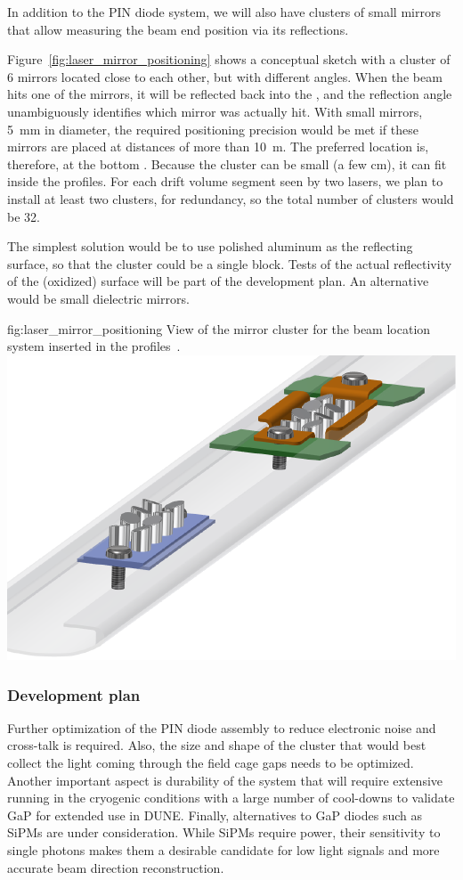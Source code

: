 In addition to the PIN diode system, we will also have clusters of small mirrors that allow measuring the beam end position via its reflections.

Figure~\ref{fig:laser_mirror_positioning} shows a conceptual sketch with a cluster of \num{6} mirrors located close to each other, but with different angles. When the beam hits one of the mirrors, it will be reflected back into the , and the reflection angle unambiguously identifies which mirror was actually hit. With small mirrors, \SI{5}{\milli\m} in diameter, the required positioning precision would be met if these mirrors are placed at distances of more than \SI{10}{\m}. The preferred location is, therefore, at the bottom . Because the cluster can be small (a few cm), it can fit inside the  profiles. For each drift volume segment seen by two lasers, we plan to install at least two clusters, for redundancy, so the total number of clusters would be \num{32}. 

The simplest solution would be to use polished aluminum as the reflecting surface, so that the cluster could be a single block. 
Tests of the actual reflectivity of the (oxidized) surface will be part of the development plan.  An alternative would be small dielectric mirrors.

\begin{dunefigure}{fig:laser_mirror_positioning}
{View of the mirror cluster for the beam location system inserted in the  profiles~\cite{bib:yu2019a}.}
\includegraphics[width=0.5\linewidth]{graphics/laser_mirror_positioning.pdf}
\end{dunefigure}


\subsubsection{Development plan}
 Further optimization of the PIN diode %
 assembly to reduce electronic noise and cross-talk is required. Also, the size and shape of the cluster that would best collect the light coming through the field cage gaps needs to be optimized.  Another important aspect is durability of the system that will require extensive running in the cryogenic conditions with  a large number of cool-downs to validate GaP for extended use in DUNE. Finally, alternatives to GaP diodes such as SiPMs are under consideration. While SiPMs require power, their sensitivity to single photons makes them a desirable candidate for low light signals and more accurate beam direction reconstruction. 

